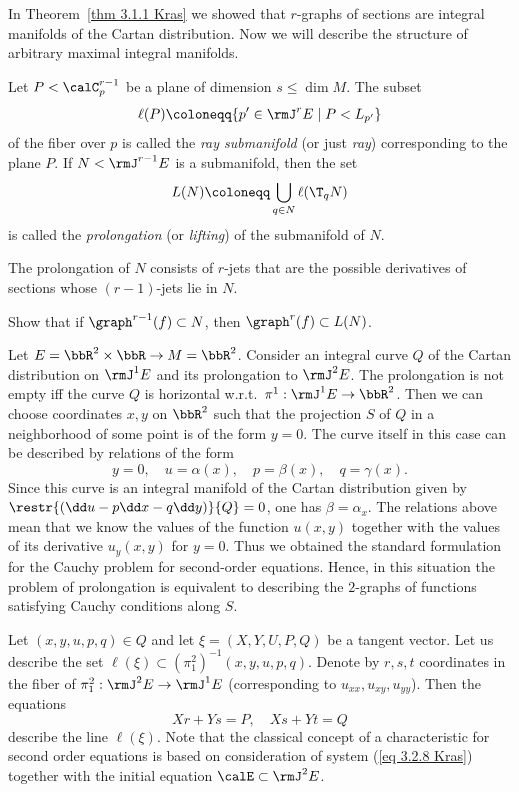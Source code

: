 In Theorem~\ref{thm 3.1.1 Kras} we showed that $r$-graphs of sections are integral manifolds of the Cartan distribution. Now we will describe the structure of arbitrary maximal integral manifolds.

\begin{defn}
    Let $P<\calC_p^{r-1}$ be a plane of dimension $s\leq \dim M$. The subset 
    \[\ell(P)\coloneqq \{p'\in \rmJ^r E\mid P<L_{p'}\}\] 
    of the fiber over $p$ is called the \emph{ray submanifold} (or just \emph{ray}) corresponding to the plane $P$. If $N<\rmJ^{r-1}E$ is a submanifold, then the set 
    \[L(N)\coloneqq \bigcup_{q\in N}\ell(\T_q N)\]
    is called the \emph{prolongation} (or \emph{lifting}) of the submanifold of $N$.
\end{defn}

The prolongation of $N$ consists of $r$-jets that are the possible derivatives of sections whose $(r-1)$-jets lie in $N$.

\begin{xca}
    Show that if $\graph^{r-1} (f)\subset N$, then $\graph^r(f)\subset L(N)$.
\end{xca}

\begin{example}
    Let $E=\bbR^2\times\bbR\to M=\bbR^2$. Consider an integral curve $Q$ of the Cartan distribution on $\rmJ^1E$ and its prolongation to $\rmJ^2E$. The prolongation is not empty iff the curve $Q$ is horizontal w.r.t.\ $\pi^1:\rmJ^1E\to \bbR^2$. Then we can choose coordinates $x,y$ on $\bbR^2$ such that the projection $S$ of $Q$ in a neighborhood of some point is of the form $y=0$.  The curve itself in this case can be described by relations of the form 
    \[y=0,\quad u=\alpha(x),\quad p=\beta(x),\quad q=\gamma(x).\]
    Since this curve is an integral manifold of the Cartan distribution given by $\restr{(\dd u-p\dd x-q\dd y)}{Q}=0$, one has $\beta=\alpha_x$. The relations above mean that we know the values of the function $u(x,y)$  together with the values of its derivative $u_y(x,y)$ for $y=0$. Thus we obtained the standard formulation for the Cauchy problem for second-order equations. Hence, in this situation the problem of prolongation is equivalent to describing the $2$-graphs of functions satisfying Cauchy conditions along $S$.

    Let $(x,y,u,p,q)\in Q$ and  let $\xi=(X,Y,U,P,Q)$ be a tangent vector. Let us describe the set $\ell(\xi)\subset (\pi^2_1)^{-1}(x,y,u,p,q)$. Denote by $r,s,t$ coordinates in the fiber of $\pi^2_1:\rmJ^2E\to \rmJ^1E$ (corresponding to $u_{xx},u_{xy},u_{yy}$). Then the equations 
    \[Xr+Ys=P,\quad Xs+Yt=Q\label{eq 3.2.8 Kras}\]
    describe the line $\ell(\xi)$. Note that the classical concept of a characteristic for second order equations is based on consideration of system (\ref{eq 3.2.8 Kras}) together with the initial equation $\calE\subset\rmJ^2E$.
\end{example}

